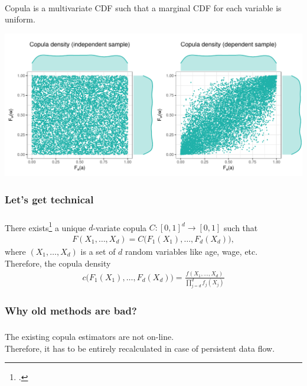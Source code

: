 \documentclass[aspectratio=169]{beamer}
\begin{document}
			\begin{frame}
				\frametitle{\insertsubsubsection}
				~\\[1em]
				Copula is a multivariate CDF such that a marginal CDF for each variable is uniform. \\[1em]
				
				\begin{center}
					\includegraphics[width=0.75\linewidth]{plots/introduction/copulas}
				\end{center}
				
			\end{frame}
			
		\subsubsection{Let's get technical}
			\begin{frame}
				\frametitle{\insertsubsubsection}
				
				 There exists\footcite{Sklar1959} a unique $ d $-variate copula $ C: [0, 1]^d \rightarrow [0, 1] $ such that
				\begin{align}
					F(X_1, \dots, X_d) = C\big(F_1(X_1), \dots, F_d(X_d)\big),
				\end{align}
				where $ (X_1, \dots, X_d) $ is a set of $ d $ random variables like age, wage, etc.\\[1em]
				
				\onslide<3-> Therefore, the copula density 
				\begin{align}
					c\big(F_1(X_1), \dots, F_d(X_d)\big) = \frac{f(X_1, \dots, X_d)}{\prod_{j=d}^{d}f_j(X_j)}
				\end{align}
				
			\end{frame}
			
		\subsubsection{Why old methods are bad?}
			\begin{frame}
				\frametitle{\insertsubsubsection}
				
				The existing copula estimators are not on-line. \\[1em]
				
				Therefore, it has to be entirely recalculated in case of persistent data flow.
				
			\end{frame}
	
\end{document}

